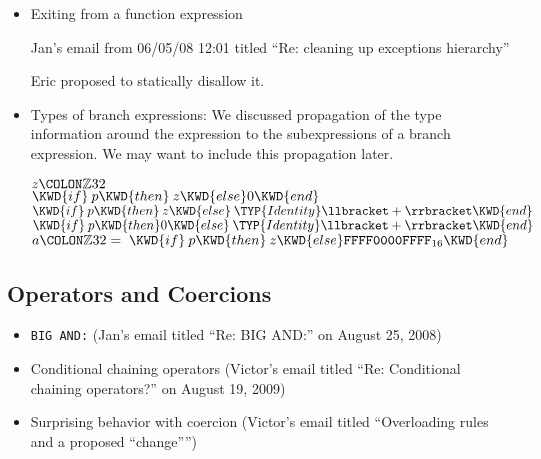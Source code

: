 \begin{itemize}
\item Exiting from a function expression

Jan's email from 06/05/08 12:01
titled ``Re: cleaning up exceptions hierarchy''

Eric proposed to statically disallow it.

\item Types of branch expressions:
We discussed propagation of the type information around the expression to the subexpressions of a branch expression. We may want to include this propagation later.

\begin{Fortress}
\(z\COLON \mathbb{Z}32\)\\
\(\KWD{if}\:p \KWD{then}\:z \KWD{else} 0 \KWD{end}\)\\
\(\KWD{if}\:p \KWD{then}\:z \KWD{else}\:\TYP{Identity}\llbracket+\rrbracket \KWD{end}\)\\
\(\KWD{if}\:p \KWD{then} 0 \KWD{else}\:\TYP{Identity}\llbracket+\rrbracket \KWD{end}\)\\[4pt]
\(a\COLON \mathbb{Z}32 = \;\KWD{if}\:p \KWD{then}\:z \KWD{else} \mathtt{FFFF0000FFFF}_{16} \KWD{end}\)
\end{Fortress}

\end{itemize}

\subsection{Operators and Coercions}
\begin{itemize}
\item \verb+BIG AND:+ (Jan's email titled ``Re: BIG AND:'' on August 25, 2008)
\item Conditional chaining operators (Victor's email titled ``Re: Conditional chaining operators?'' on August 19, 2009)

\item Surprising behavior with coercion (Victor's email titled ``Overloading rules and a proposed ``change'''')

\end{itemize}

